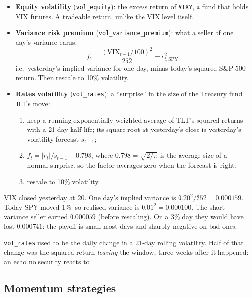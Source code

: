 \documentclass[11pt,a4paper]{article}
\newcommand{\fid}[1]{\texttt{#1}}
\begin{document}
\begin{method}
\begin{itemize}[leftmargin=1.2em]
  \item \textbf{Equity volatility} (\fid{vol\_equity}): the excess return of \texttt{VIXY}, a fund that holds VIX futures. A tradeable return, unlike the VIX level itself.
  \item \textbf{Variance risk premium} (\fid{vol\_variance\_premium}): what a seller of one day's variance earns:
  \[
    f_t = \frac{(\text{VIX}_{t-1}/100)^2}{252} - r_{t,\text{SPY}}^2
  \]
  i.e.\ yesterday's implied variance for one day, minus today's squared S\&P 500 return. Then rescale to 10\% volatility.
  \item \textbf{Rates volatility} (\fid{vol\_rates}): a ``surprise'' in the size of the Treasury fund \texttt{TLT}'s move:
  \begin{enumerate}[leftmargin=1.4em]
    \item keep a running exponentially weighted average of TLT's squared returns with a 21-day half-life; its square root at yesterday's close is yesterday's volatility forecast $s_{t-1}$;
    \item $f_t = |r_t|/s_{t-1} - 0.798$, where $0.798=\sqrt{2/\pi}$ is the average size of a normal surprise, so the factor averages zero when the forecast is right;
    \item rescale to 10\% volatility.
  \end{enumerate}
\end{itemize}
\end{method}

\begin{example}
VIX closed yesterday at 20. One day's implied variance is $0.20^2/252 = 0.000159$.
Today SPY moved 1\%, so realised variance is $0.01^2 = 0.000100$. The short-variance
seller earned $0.000059$ (before rescaling). On a 3\% day they would have lost
$0.000741$: the payoff is small most days and sharply negative on bad ones.
\end{example}

\begin{tip}
\fid{vol\_rates} used to be the daily change in a 21-day rolling volatility. Half of
that change was the squared return \emph{leaving} the window, three weeks after it
happened: an echo no security reacts to.
\end{tip}

\subsection{Momentum strategies}
\end{document}
